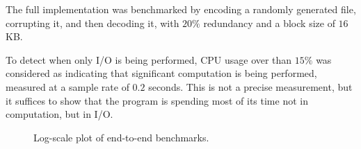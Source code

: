 The full implementation was benchmarked by encoding a randomly generated file, corrupting it, and then decoding it, with $20\%$ redundancy and a block size of $16$ KB.

To detect when only I/O is being performed, CPU usage over than $15\%$ was considered as indicating that significant computation is being performed, measured at a sample rate of $0.2$ seconds.
This is not a precise measurement, but it suffices to show that the program is spending most of its time not in computation, but in I/O.

\begin{figure}[!hbt]
\begin{center}

\end{center}
\caption{Log-scale plot of end-to-end benchmarks.}
\end{figure}
